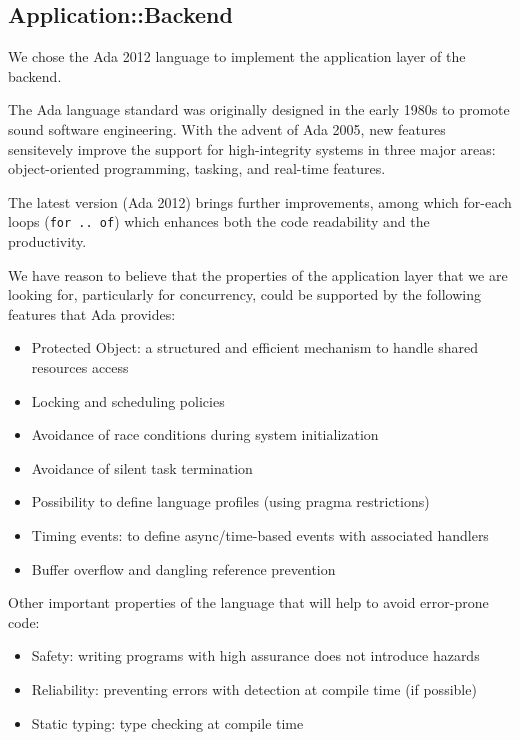 \subsection{Application::Backend}
We chose the Ada 2012 language to implement the application layer of the
backend.

The Ada language standard was originally designed in the early 1980s to promote
sound software engineering. With the advent of Ada 2005, new features
sensitevely improve the support for high-integrity systems in three major
areas: object-oriented programming, tasking, and real-time features.

The latest version (Ada 2012) brings further improvements, among which for-each
loops (\texttt{for .. of}) which enhances both the code readability and the
productivity.

We have reason to believe that the properties of the application layer
that we are looking for, particularly for concurrency, could be supported
by the following features that Ada provides:
\begin{itemize}
    \item Protected Object: a structured and efficient mechanism to handle
shared resources access
    \item Locking and scheduling policies
    \item Avoidance of race conditions during system initialization
    \item Avoidance of silent task termination
    \item Possibility to define language profiles (using pragma restrictions)
    \item Timing events: to define async/time-based events with associated
handlers
    \item Buffer overflow and dangling reference prevention
\end{itemize}

Other important properties of the language that will help to avoid error-prone
code:
\begin{itemize}
    \item Safety: writing programs with high assurance does not introduce
hazards
    \item Reliability: preventing errors with detection at compile time
(if possible)
    \item Static typing: type checking at compile time
\end{itemize}
